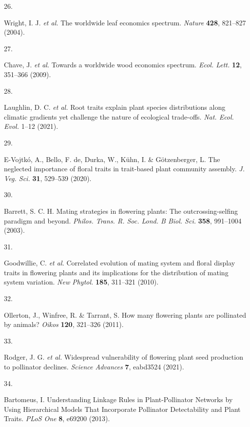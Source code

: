 \documentclass[
  12pt,
  a4paper,
]{article}
\newlength{\cslhangindent}
\newlength{\csllabelwidth}
\newlength{\cslentryspacingunit} %
\newenvironment{CSLReferences}[2] %
 {%
  \setlength{\parindent}{0pt}
  \ifodd #1
  \let\oldpar\par
  \def\par{\hangindent=\cslhangindent\oldpar}
  \fi
  \setlength{\parskip}{#2\cslentryspacingunit}
 }%
 {}
\newcommand{\CSLLeftMargin}[1]{\parbox[t]{\csllabelwidth}{#1}}
\newcommand{\CSLRightInline}[1]{\parbox[t]{\linewidth - \csllabelwidth}{#1}\break}
\begin{document}
\begin{CSLReferences}{0}{0}
\leavevmode{}%
\CSLLeftMargin{26. }
\CSLRightInline{Wright, I. J. \emph{et al.} The worldwide leaf economics spectrum. \emph{Nature} \textbf{428}, 821--827 (2004).}

\leavevmode{}%
\CSLLeftMargin{27. }
\CSLRightInline{Chave, J. \emph{et al.} Towards a worldwide wood economics spectrum. \emph{Ecol. Lett.} \textbf{12}, 351--366 (2009).}

\leavevmode{}%
\CSLLeftMargin{28. }
\CSLRightInline{Laughlin, D. C. \emph{et al.} Root traits explain plant species distributions along climatic gradients yet challenge the nature of ecological trade-offs. \emph{Nat. Ecol. Evol.} 1--12 (2021).}

\leavevmode{}%
\CSLLeftMargin{29. }
\CSLRightInline{E-Vojtkó, A., Bello, F. de, Durka, W., Kühn, I. \& Götzenberger, L. The neglected importance of floral traits in trait-based plant community assembly. \emph{J. Veg. Sci.} \textbf{31}, 529--539 (2020).}

\leavevmode{}%
\CSLLeftMargin{30. }
\CSLRightInline{Barrett, S. C. H. Mating strategies in flowering plants: The outcrossing-selfing paradigm and beyond. \emph{Philos. Trans. R. Soc. Lond. B Biol. Sci.} \textbf{358}, 991--1004 (2003).}

\leavevmode{}%
\CSLLeftMargin{31. }
\CSLRightInline{Goodwillie, C. \emph{et al.} Correlated evolution of mating system and floral display traits in flowering plants and its implications for the distribution of mating system variation. \emph{New Phytol.} \textbf{185}, 311--321 (2010).}

\leavevmode{}%
\CSLLeftMargin{32. }
\CSLRightInline{Ollerton, J., Winfree, R. \& Tarrant, S. How many flowering plants are pollinated by animals? \emph{Oikos} \textbf{120}, 321--326 (2011).}

\leavevmode{}%
\CSLLeftMargin{33. }
\CSLRightInline{Rodger, J. G. \emph{et al.} Widespread vulnerability of flowering plant seed production to pollinator declines. \emph{Science Advances} \textbf{7}, eabd3524 (2021).}

\leavevmode{}%
\CSLLeftMargin{34. }
\CSLRightInline{Bartomeus, I. Understanding {Linkage Rules} in {Plant}-{Pollinator Networks} by {Using Hierarchical Models That Incorporate Pollinator Detectability} and {Plant Traits}. \emph{PLoS One} \textbf{8}, e69200 (2013).}


\end{CSLReferences}
\end{document}
